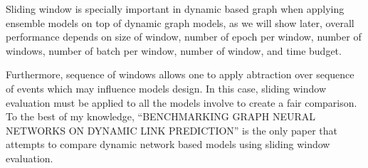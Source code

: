 \documentclass{IEEEtran}
\begin{document}
Sliding window is specially important in dynamic based graph when applying ensemble models on top of dynamic graph models, as we will show later, overall performance depends on size of window, number of epoch per window, number of windows, number of batch per window, number of window, and time budget.

Furthermore, sequence of windows allows one to apply abtraction over sequence of events which may influence models design. In this case, sliding window evaluation must be applied to all the models involve to create a fair comparison.
To the best of my knowledge, ``BENCHMARKING GRAPH NEURAL NETWORKS ON DYNAMIC LINK PREDICTION'' \cite{skarding2021benchmarking} is the only paper that attempts to compare dynamic network based models using sliding window evaluation.


\printbibliography
\end{document}
